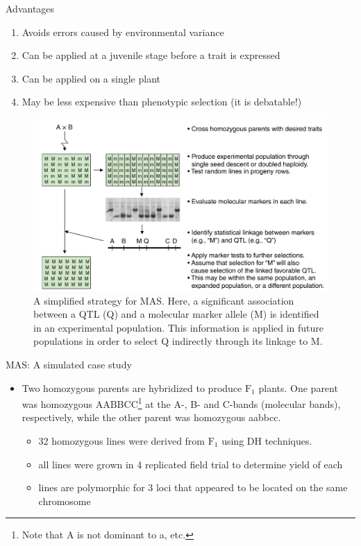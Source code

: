 \documentclass[11pt,dvipsnames,ignorenonframetext,aspectratio=169]{beamer}
\providecommand{\tightlist}{%
  \setlength{\itemsep}{0pt}\setlength{\parskip}{0pt}}
\begin{document}
\begin{frame}{Advantages}
\protect\hypertarget{advantages}{}
\begin{enumerate}
\tightlist
\item
  Avoids errors caused by environmental variance
\item
  Can be applied at a juvenile stage before a trait is expressed
\item
  Can be applied on a single plant
\item
  May be less expensive than phenotypic selection (it is debatable!)
\end{enumerate}

\begin{figure}
\includegraphics[width=0.38\linewidth]{../images/marker_assisted_selection} \caption{A simplified strategy for MAS. Here, a significant association between a QTL (Q) and a molecular marker allele (M) is identified in an experimental population. This information is applied in future populations in order to select Q indirectly through its linkage to M.}\label{fig:marker-assisted-selection}
\end{figure}
\end{frame}

\begin{frame}{MAS: A simulated case study}
\protect\hypertarget{mas-a-simulated-case-study}{}
\footnotesize

\begin{itemize}
\tightlist
\item
  Two homozygous parents are hybridized to produce \(\mathrm{F_1}\)
  plants. One parent was homozygous
  AABBCC\footnote[frame]{Note that A is not dominant to a, etc.} at the
  A-, B- and C-bands (molecular bands), respectively, while the other
  parent was homozygous aabbcc.

  \begin{itemize}
  \footnotesize
  \item 32 homozygous lines were derived from $\mathrm{F_1}$ using DH techniques.
  \item all lines were grown in 4 replicated field trial to determine yield of each
  \item lines are polymorphic for 3 loci that appeared to be located on the same chromosome
  \end{itemize}
\end{itemize}
\end{frame}
\end{document}
